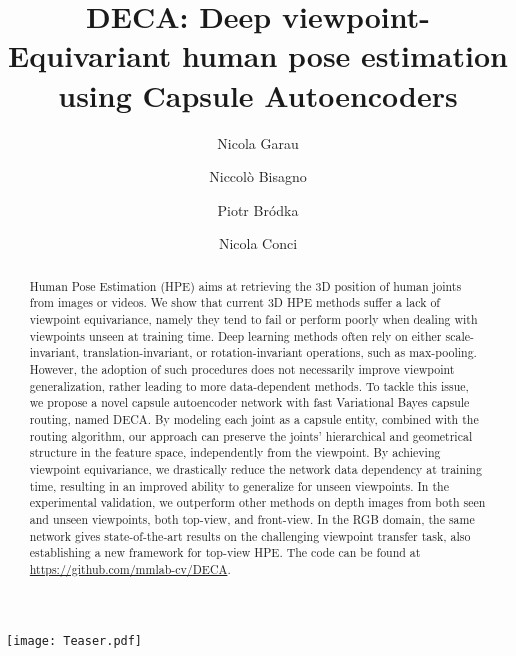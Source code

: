 \documentclass[10pt,twocolumn,letterpaper]{article}
\begin{document}
\title{DECA: Deep viewpoint-Equivariant human pose estimation using Capsule Autoencoders}



\author[1]{Nicola Garau}
\author[1]{Niccolò Bisagno}
\author[1]{Piotr Bródka}
\author[1]{Nicola Conci}

\maketitle
\ificcvfinal\thispagestyle{empty}\fi

\vspace*{-50pt}
\begin{strip}
    \centering
    \texttt{[image: Teaser.pdf]}
    \vspace*{-10pt}
    \label{fig:teaser}
\end{strip}

\begin{abstract}
Human Pose Estimation (HPE) aims at retrieving the 3D position of human joints from images or videos. We show that current 3D HPE methods suffer a lack of viewpoint equivariance, namely they tend to fail or perform poorly when dealing with viewpoints unseen at training time. Deep learning methods often rely on either scale-invariant, translation-invariant, or rotation-invariant operations, such as max-pooling. However, the adoption of such procedures does not necessarily improve viewpoint generalization, rather leading to more data-dependent methods.
To tackle this issue, we propose a novel capsule autoencoder network with fast Variational Bayes capsule routing, named DECA.
By modeling each joint as a capsule entity, combined with the routing algorithm, our approach can preserve the joints' hierarchical and geometrical structure in the feature space, independently from the viewpoint. 
By achieving viewpoint equivariance, we drastically reduce the network data dependency at training time, resulting in an improved ability to generalize for unseen viewpoints.
In the experimental validation, we outperform other methods on depth images from both seen and unseen viewpoints, both top-view, and front-view. In the RGB domain, the same network gives state-of-the-art results on the challenging viewpoint transfer task, also establishing a new framework for top-view HPE.
The code can be found at \url{https://github.com/mmlab-cv/DECA}.
\end{abstract}
\end{document}
